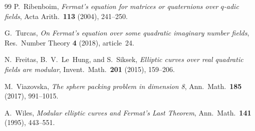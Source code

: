 \documentclass[11pt]{amsart}
\theoremstyle{plain}
\theoremstyle{definition}
\theoremstyle{remark}
\begin{document}
\begin{thebibliography}{99}
P.~Ribenboim,
\emph{Fermat's equation for matrices or quaternions over $q$-adic fields},
Acta Arith.\ \textbf{113} (2004), 241--250.

G.~Turcas,
\emph{On Fermat's equation over some quadratic imaginary number fields},
Res.\ Number Theory \textbf{4} (2018), article~24.

N.~Freitas, B.~V.~Le~Hung, and S.~Siksek,
\emph{Elliptic curves over real quadratic fields are modular},
Invent.\ Math.\ \textbf{201} (2015), 159--206.

M.~Viazovska,
\emph{The sphere packing problem in dimension 8},
Ann.\ Math.\ \textbf{185} (2017), 991--1015.

A.~Wiles,
\emph{Modular elliptic curves and Fermat's Last Theorem},
Ann.\ Math.\ \textbf{141} (1995), 443--551.

\end{thebibliography}
\end{document}

